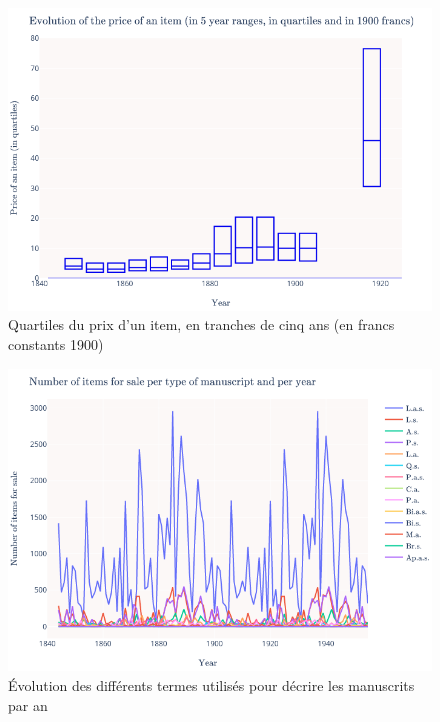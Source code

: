 \begin{figure}[p]
	\includegraphics[width=\textwidth]{annexes/fig_quart_itm.png}
	\caption{Quartiles du prix d'un item, en tranches de cinq ans (en francs constants 1900)}
	\label{appendix:quartitm}
\end{figure}

\begin{figure}[p]
	\includegraphics[width=\textwidth]{annexes/fig_term_itm.png}
	\caption{Évolution des différents termes utilisés pour décrire les manuscrits par an}
	\label{appendix:termitm}
\end{figure}

